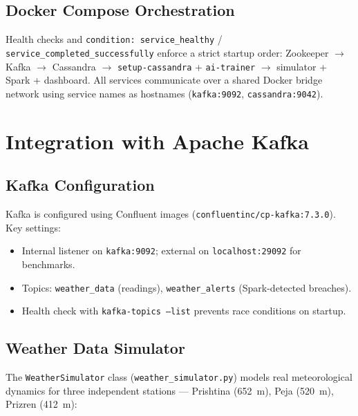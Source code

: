 \documentclass[conference,a4paper]{IEEEtran}
\begin{document}
\subsection{Docker Compose Orchestration}

Health checks and \texttt{condition: service\_healthy} / \texttt{service\_completed\_successfully} enforce a strict startup order:
Zookeeper $\to$ Kafka $\to$ Cassandra $\to$ \texttt{setup-cassandra} + \texttt{ai-trainer} $\to$ simulator + Spark + dashboard.
All services communicate over a shared Docker bridge network using service names as hostnames (\texttt{kafka:9092}, \texttt{cassandra:9042}).

\section{Integration with Apache Kafka}

\subsection{Kafka Configuration}

Kafka is configured using Confluent images (\texttt{confluentinc/cp-kafka:7.3.0}).
Key settings:
\begin{itemize}
  \item Internal listener on \texttt{kafka:9092}; external on \texttt{localhost:29092} for benchmarks.
  \item Topics: \texttt{weather\_data} (readings), \texttt{weather\_alerts} (Spark-detected breaches).
  \item Health check with \texttt{kafka-topics --list} prevents race conditions on startup.
\end{itemize}

\subsection{Weather Data Simulator}

The \texttt{WeatherSimulator} class (\texttt{weather\_simulator.py}) models real meteorological dynamics for three independent stations --- Prishtina (652~m), Peja (520~m), Prizren (412~m):
\end{document}
